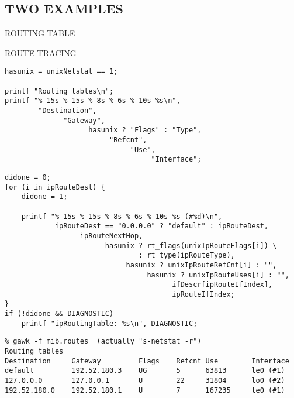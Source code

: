 \begin{bwslide}
\part*	{TWO EXAMPLES}\bf

\begin{nrtc}
\item	ROUTING TABLE

\item	ROUTE TRACING
\end{nrtc}
\end{bwslide}


\begin{bwslide}

\vspace{0.5in}
\smaller
\begin{verbatim}
hasunix = unixNetstat == 1;

printf "Routing tables\n";
printf "%-15s %-15s %-8s %-6s %-10s %s\n",
        "Destination",
              "Gateway",
                    hasunix ? "Flags" : "Type",
                         "Refcnt",
                              "Use",
                                   "Interface";
\end{verbatim}
\end{bwslide}


\begin{bwslide}

\vspace{0.5in}
\smaller
\begin{verbatim}
didone = 0;
for (i in ipRouteDest) {
    didone = 1;

    printf "%-15s %-15s %-8s %-6s %-10s %s (#%d)\n",
            ipRouteDest == "0.0.0.0" ? "default" : ipRouteDest,
                  ipRouteNextHop,
                        hasunix ? rt_flags(unixIpRouteFlags[i]) \
                                : rt_type(ipRouteType),
                             hasunix ? unixIpRouteRefCnt[i] : "",
                                  hasunix ? unixIpRouteUses[i] : "",
                                        ifDescr[ipRouteIfIndex],
                                        ipRouteIfIndex;
}
if (!didone && DIAGNOSTIC)
    printf "ipRoutingTable: %s\n", DIAGNOSTIC;
\end{verbatim}
\end{bwslide}


\begin{bwslide}

\vspace{0.5in}
\smaller
\begin{verbatim}
% gawk -f mib.routes  (actually "s-netstat -r")
Routing tables
Destination     Gateway         Flags    Refcnt Use        Interface
default         192.52.180.3    UG       5      63813      le0 (#1)
127.0.0.0       127.0.0.1       U        22     31804      lo0 (#2)
192.52.180.0    192.52.180.1    U        7      167235     le0 (#1)
\end{verbatim}
\end{bwslide}


